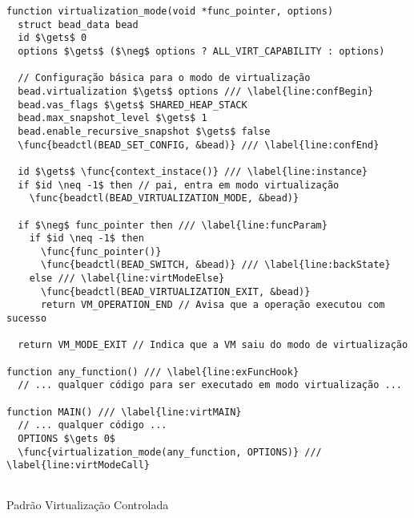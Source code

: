 \begin{pseudocode}
\begin{lstlisting}[language=pseudocode, style=pseudocode]
function virtualization_mode(void *func_pointer, options)
  struct bead_data bead
  id $\gets$ 0
  options $\gets$ ($\neg$ options ? ALL_VIRT_CAPABILITY : options)

  // Configuração básica para o modo de virtualização
  bead.virtualization $\gets$ options /// \label{line:confBegin}
  bead.vas_flags $\gets$ SHARED_HEAP_STACK
  bead.max_snapshot_level $\gets$ 1
  bead.enable_recursive_snapshot $\gets$ false
  \func{beadctl(BEAD_SET_CONFIG, &bead)} /// \label{line:confEnd}

  id $\gets$ \func{context_instace()} /// \label{line:instance}
  if $id \neq -1$ then // pai, entra em modo virtualização
    \func{beadctl(BEAD_VIRTUALIZATION_MODE, &bead)}

  if $\neg$ func_pointer then /// \label{line:funcParam}
    if $id \neq -1$ then
      \func{func_pointer()}
      \func{beadctl(BEAD_SWITCH, &bead)} /// \label{line:backState}
    else /// \label{line:virtModeElse}
      \func{beadctl(BEAD_VIRTUALIZATION_EXIT, &bead)}
      return VM_OPERATION_END // Avisa que a operação executou com sucesso

  return VM_MODE_EXIT // Indica que a VM saiu do modo de virtualização

function any_function() /// \label{line:exFuncHook}
  // ... qualquer código para ser executado em modo virtualização ...      

function MAIN() /// \label{line:virtMAIN}
  // ... qualquer código ...
  OPTIONS $\gets 0$
  \func{virtualization_mode(any_function, OPTIONS)} /// \label{line:virtModeCall}
  
\end{lstlisting}

  \caption{Padrão Virtualização Controlada}
  \label{alg:virtMode}
\end{pseudocode}
